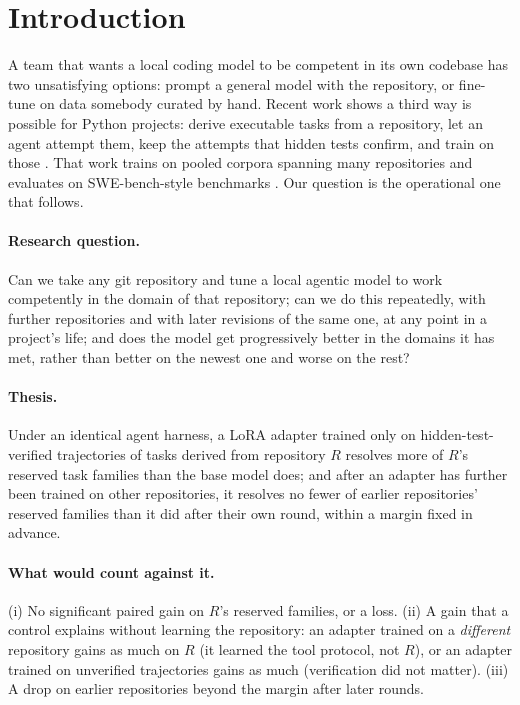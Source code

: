 
\section{Introduction}

A team that wants a local coding model to be competent in its own codebase has two
unsatisfying options: prompt a general model with the repository, or fine-tune on data
somebody curated by hand. Recent work shows a third way is possible for Python
projects: derive executable tasks from a repository, let an agent attempt them, keep the
attempts that hidden tests confirm, and train on those
\citep{yang2025swesmith,pan2025swegym,jain2025r2egym}. That work trains on pooled
corpora spanning many repositories and evaluates on SWE-bench-style benchmarks
\citep{jimenez2024swebench}. Our question is the operational one that follows.

\paragraph{Research question.} Can we take any git repository and tune a local agentic
model to work competently in the domain of that repository; can we do this repeatedly,
with further repositories and with later revisions of the same one, at any point in a
project's life; and does the model get progressively better in the domains it has
met, rather than better on the newest one and worse on the rest?

\paragraph{Thesis.} Under an identical agent harness, a LoRA adapter \citep{hu2021lora}
trained only on hidden-test-verified trajectories of tasks derived from repository $R$
resolves more of $R$'s reserved task families than the base model does; and after an
adapter has further been trained on other repositories, it resolves no fewer of
earlier repositories' reserved families than it did after their own round, within a
margin fixed in advance.

\paragraph{What would count against it.} (i) No significant paired gain on $R$'s reserved
families, or a loss. (ii) A gain that a control explains without learning the
repository: an adapter trained on a \emph{different} repository gains as much on $R$
(it learned the tool protocol, not $R$), or an adapter trained on unverified
trajectories gains as much (verification did not matter). (iii) A drop on earlier
repositories beyond the margin after later rounds.

